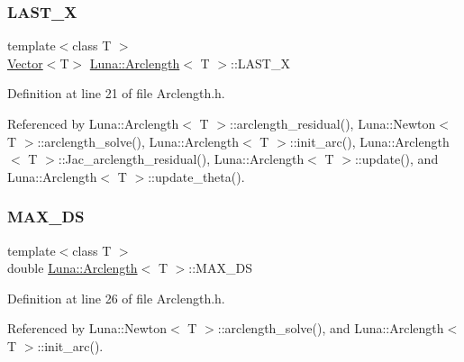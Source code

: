 \mbox{\label{classLuna_1_1Arclength_a6d6ba83245b4dd616d265609a93035a2}} 
\subsubsection{\texorpdfstring{L\+A\+S\+T\+\_\+X}{LAST\_X}}
{\footnotesize\ttfamily template$<$class T $>$ \\
\hyperlink{classLuna_1_1Vector}{Vector}$<$T$>$ \hyperlink{classLuna_1_1Arclength}{Luna\+::\+Arclength}$<$ T $>$\+::L\+A\+S\+T\+\_\+X\hspace{0.3cm}{\ttfamily [protected]}}



Definition at line 21 of file Arclength.\+h.



Referenced by Luna\+::\+Arclength$<$ T $>$\+::arclength\+\_\+residual(), Luna\+::\+Newton$<$ T $>$\+::arclength\+\_\+solve(), Luna\+::\+Arclength$<$ T $>$\+::init\+\_\+arc(), Luna\+::\+Arclength$<$ T $>$\+::\+Jac\+\_\+arclength\+\_\+residual(), Luna\+::\+Arclength$<$ T $>$\+::update(), and Luna\+::\+Arclength$<$ T $>$\+::update\+\_\+theta().

\mbox{\label{classLuna_1_1Arclength_a8fcd2b977d7ce78342f113d4e69ad8f1}} 
\subsubsection{\texorpdfstring{M\+A\+X\+\_\+\+DS}{MAX\_DS}}
{\footnotesize\ttfamily template$<$class T $>$ \\
double \hyperlink{classLuna_1_1Arclength}{Luna\+::\+Arclength}$<$ T $>$\+::M\+A\+X\+\_\+\+DS\hspace{0.3cm}{\ttfamily [protected]}}



Definition at line 26 of file Arclength.\+h.



Referenced by Luna\+::\+Newton$<$ T $>$\+::arclength\+\_\+solve(), and Luna\+::\+Arclength$<$ T $>$\+::init\+\_\+arc().

